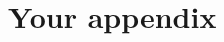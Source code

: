 \documentclass{msu-thesis}
\begin{document}
\chapter{Your appendix}
%
\backmatter
%
%
\makebibliographypage
\SingleSpacing

\nocite{braidlab}
\nocite{Kin2007}
\printbibliography
\end{document}
